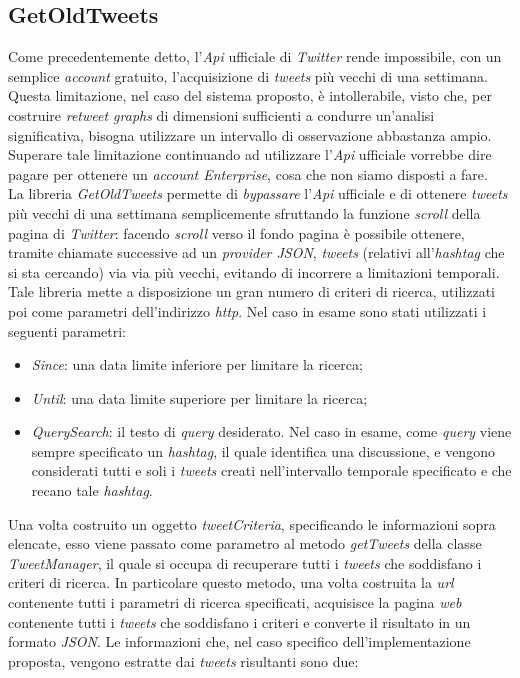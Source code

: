 \subsection{GetOldTweets}
Come precedentemente detto, l'\textit{Api} ufficiale di \textit{Twitter} rende impossibile, con un semplice \textit{account} gratuito, l'acquisizione di \textit{tweets} più vecchi di una settimana. Questa limitazione, nel caso del sistema proposto, è intollerabile, visto che, per costruire \textit{retweet graphs} di dimensioni sufficienti a condurre un'analisi significativa, bisogna utilizzare un intervallo di osservazione abbastanza ampio. Superare tale limitazione continuando ad utilizzare l'\textit{Api} ufficiale vorrebbe dire pagare per ottenere un \textit{account Enterprise}, cosa che non siamo disposti a fare. 
\\La libreria \textit{GetOldTweets} permette di \textit{bypassare} l'\textit{Api} ufficiale e di ottenere \textit{tweets} più vecchi di una settimana semplicemente sfruttando la funzione \textit{scroll} della pagina di \textit{Twitter}: facendo \textit{scroll} verso il fondo pagina è possibile ottenere, tramite chiamate successive ad un \textit{provider JSON}, \textit{tweets} (relativi all'\textit{hashtag} che si sta cercando) via via più vecchi, evitando di incorrere a limitazioni temporali. Tale libreria mette a disposizione un gran numero di criteri di ricerca, utilizzati poi come parametri dell'indirizzo \textit{http}. Nel caso in esame sono stati utilizzati i seguenti parametri:
\begin{itemize}
\item \textit{Since}: una data limite inferiore per limitare la ricerca;
\item \textit{Until}: una data limite superiore per limitare la ricerca;
\item \textit{QuerySearch}: il testo di \textit{query} desiderato. Nel caso in esame, come \textit{query} viene sempre specificato un \textit{hashtag}, il quale identifica una discussione, e vengono considerati tutti e soli i \textit{tweets} creati nell'intervallo temporale specificato e che recano tale \textit{hashtag}.
\end{itemize}
Una volta costruito un oggetto \textit{tweetCriteria}, specificando le informazioni sopra elencate, esso viene passato come parametro al metodo \textit{getTweets} della classe \textit{TweetManager}, il quale si occupa di recuperare tutti i \textit{tweets} che soddisfano i criteri di ricerca. In particolare questo metodo, una volta costruita la \textit{url} contenente tutti i parametri di ricerca specificati, acquisisce la pagina \textit{web} contenente tutti i \textit{tweets} che soddisfano i criteri e converte il risultato in un formato \textit{JSON}. Le informazioni che, nel caso specifico dell'implementazione proposta, vengono estratte dai \textit{tweets} risultanti sono due:
